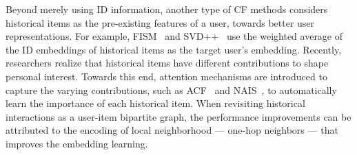 Beyond merely using ID information, another type of CF methods considers historical items as the pre-existing features of a user, towards better user representations.
For example,  FISM~\cite{FISM} and SVD++~\cite{SVD++} use the weighted average of the ID embeddings of historical items as the target user's embedding. 
Recently, researchers realize that historical items have different contributions to shape personal interest.
Towards this end, attention mechanisms are introduced to capture the varying contributions, such as ACF~\cite{ACF} and NAIS~\cite{NAIS}, to automatically learn the importance of each historical item. 
When revisiting historical interactions as a user-item bipartite graph, the performance improvements can be attributed to the encoding of local neighborhood --- one-hop neighbors --- that improves the embedding learning.

